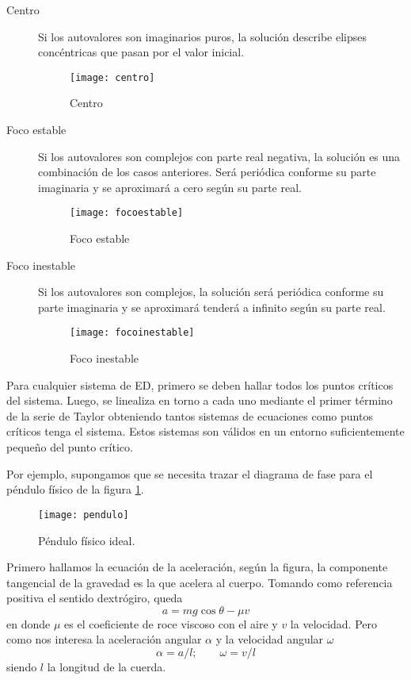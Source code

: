 \begin{description}
\item[Centro]
Si los autovalores son imaginarios puros, la solución describe elipses concéntricas que pasan por el valor inicial.
\begin{figure}
\centering\texttt{[image: centro]}
\caption{Centro}
\end{figure}

\item[Foco estable]
Si los autovalores son complejos con parte real negativa, la solución es una combinación de los casos anteriores. Será periódica conforme su parte imaginaria y se aproximará a cero según su parte real.
%
\begin{figure}
\centering\texttt{[image: focoestable]}
\caption{Foco estable}
\end{figure}

\item[Foco inestable]
Si los autovalores son complejos, la solución será periódica conforme su parte imaginaria y se aproximará tenderá a infinito según su parte real.
%
\begin{figure}
\centering\texttt{[image: focoinestable]}
\caption{Foco inestable}
\end{figure}

\end{description}

Para cualquier  sistema de ED, primero se deben hallar todos los puntos críticos del sistema. Luego, se linealiza en torno a cada uno mediante el primer término de la serie de Taylor obteniendo tantos sistemas de ecuaciones como puntos críticos tenga el sistema.
Estos sistemas son válidos en un entorno suficientemente pequeño del punto crítico.

Por ejemplo, supongamos que se necesita trazar el diagrama de fase para el péndulo físico de la figura \ref{fig:pendulo}.
%
\begin{figure}[htpb]
	\centering
	\texttt{[image: pendulo]}
	\caption{Péndulo físico ideal.}
	\label{fig:pendulo}
\end{figure}

Primero hallamos la ecuación de la aceleración, según la figura, la componente tangencial de la gravedad es la que acelera al cuerpo.
Tomando como referencia positiva el sentido dextrógiro, queda
%
\begin{equation}
a=mg\cos\theta - \mu v \nonumber
\end{equation}
%
en donde $\mu$ es el coeficiente de roce viscoso con el aire y $v$ la velocidad. Pero como nos interesa la aceleración angular $\alpha$ y la velocidad angular $\omega$
%
\begin{equation}
\alpha=a/l; \qquad \omega=v/l \nonumber
\end{equation}
%
siendo $l$ la longitud de la cuerda.

